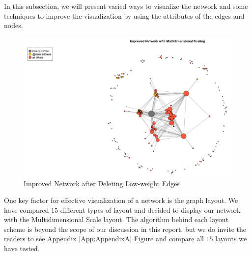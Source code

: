 
In this subsection, we will present varied ways to visualize the network and some techniques to improve the visualization by using the attributes of the edges and nodes.

\begin{figure}[ht]
\centering
\caption{Improved Network after Deleting Low-weight Edges}
\label{fig:improvednw}
\includegraphics[width = 1\textwidth]{report_dms_layout}
\end{figure}

One key factor for effective visualization of a network is the graph layout. We have compared $15$ different types of layout and decided to display our network with the Multidimensional Scale layout. The algorithm behind each layout scheme is beyond the scope of our discussion in this report, but we do invite the readers to see Appendix \ref{App:AppendixA} Figure   and compare all $15$ layouts we have tested.


